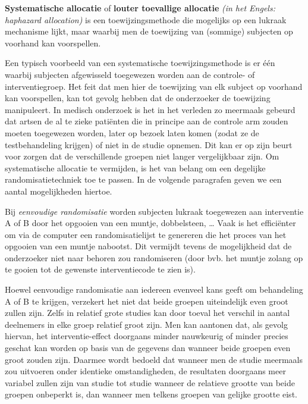 \documentclass[12pt,dutch,coursenotes]{book}
\theoremstyle{definition}
\theoremstyle{definition}
\theoremstyle{definition}
\theoremstyle{remark}
\let\BeginKnitrBlock\begin \let\EndKnitrBlock\end
\begin{document}
\BeginKnitrBlock{definition}[systematische allocatie]
\protect\hypertarget{def:unnamed-chunk-16}{}{\label{def:unnamed-chunk-16}
\iffalse (systematische allocatie) \fi{} }\textbf{Systematische
allocatie} of \textbf{louter toevallige allocatie} \emph{(in het Engels:
haphazard allocation)} is een toewijzingsmethode die mogelijks op een
lukraak mechanisme lijkt, maar waarbij men de toewijzing van (sommige)
subjecten op voorhand kan voorspellen.
\EndKnitrBlock{definition}

Een typisch voorbeeld van een systematische toewijzingsmethode is er één
waarbij subjecten afgewisseld toegewezen worden aan de controle- of
interventiegroep. Het feit dat men hier de toewijzing van elk subject op
voorhand kan voorspellen, kan tot gevolg hebben dat de onderzoeker de
toewijzing manipuleert. In medisch onderzoek is het in het verleden zo
meermaals gebeurd dat artsen de al te zieke patiënten die in principe
aan de controle arm zouden moeten toegewezen worden, later op bezoek
laten komen (zodat ze de testbehandeling krijgen) of niet in de studie
opnemen. Dit kan er op zijn beurt voor zorgen dat de verschillende
groepen niet langer vergelijkbaar zijn. Om systematische allocatie te
vermijden, is het van belang om een degelijke randomisatietechniek toe
te passen. In de volgende paragrafen geven we een aantal mogelijkheden
hiertoe.

Bij \emph{eenvoudige randomisatie} worden subjecten lukraak toegewezen
aan interventie A of B door het opgooien van een muntje, dobbelsteen,
\ldots{} Vaak is het efficiënter om via de computer een
randomisatielijst te genereren die het proces van het opgooien van een
muntje nabootst. Dit vermijdt tevens de mogelijkheid dat de onderzoeker
niet naar behoren zou randomiseren (door bvb. het muntje zolang op te
gooien tot de gewenste interventiecode te zien is).

Hoewel eenvoudige randomisatie aan iedereen evenveel kans geeft om
behandeling A of B te krijgen, verzekert het niet dat beide groepen
uiteindelijk even groot zullen zijn. Zelfs in relatief grote studies kan
door toeval het verschil in aantal deelnemers in elke groep relatief
groot zijn. Men kan aantonen dat, als gevolg hiervan, het
interventie-effect doorgaans minder nauwkeurig of minder precies geschat
kan worden op basis van de gegevens dan wanneer beide groepen even groot
zouden zijn. Daarmee wordt bedoeld dat wanneer men de studie meermaals
zou uitvoeren onder identieke omstandigheden, de resultaten doorgaans
meer variabel zullen zijn van studie tot studie wanneer de relatieve
grootte van beide groepen onbeperkt is, dan wanneer men telkens groepen
van gelijke grootte eist.
\end{document}
